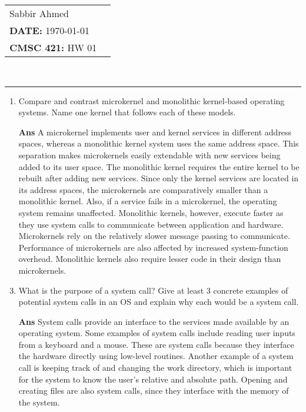 \documentclass[paper=usletter, fontsize=12pt]{extarticle}
\newcommand{\documentinfo}[5]{
    \begin{centering}
        \parbox{2in}{
        \begin{spacing}{1}
            \begin{flushleft}
                \begin{tabular}{l l}
                    #1 \\
                    #2 \\
                    #3 \\
                \end{tabular}\\
                \rule{\textwidth}{1pt}
            \end{flushleft}
        \end{spacing}
        }
    \end{centering}
}
\begin{document}
    \documentinfo{Sabbir Ahmed}{\textbf{DATE:} \today}{\textbf{CMSC 421:} HW 01}
    \vspace{-0.2in}

    \begin{enumerate}[label=\textbf{\arabic*}]

        \item Compare and contrast microkernel and monolithic kernel-based
        operating systems. Name one kernel that follows each of these models.
        \item[\textbf{Ans}]
        A microkernel implements user and kernel services in different address
        spaces, whereas a monolithic kernel system uses the same address space.
        This separation makes microkernels easily extendable with new services
        being added to its user space. The monolithic kernel requires the
        entire kernel to be rebuilt after adding new services. Since only the
        kernel services are located in its address spaces, the microkernels are
        comparatively smaller than a monolithic kernel. Also, if a service
        fails in a microkernel, the operating system remains unaffected.
        Monolithic kernels, however, execute faster as they use system calls to
        communicate between application and hardware. Microkernels rely on the
        relatively slower message passing to communicate. Performance of
        microkernels are also affected by increased system-function overhead.
        Monolithic kernels also require lesser code in their design than
        microkernels.
        \vspace{0.2in}

        \item What is the purpose of a system call? Give at least 3 concrete
        examples of potential system calls in an OS and explain why each would
        be a system call.
        \item[\textbf{Ans}]
        System calls provide an interface to the services made available by an
        operating system. Some examples of system calls include reading user
        inputs from a keyboard and a mouse. These are system calls because they
        interface the hardware directly using low-level routines. Another
        example of a system call is keeping track of and changing the work
        directory, which is important for the system to know the user's
        relative and absolute path. Opening and creating files are also system
        calls, since they interface with the memory of the system.
        \vspace{0.2in}


\end{enumerate}
\end{document}
